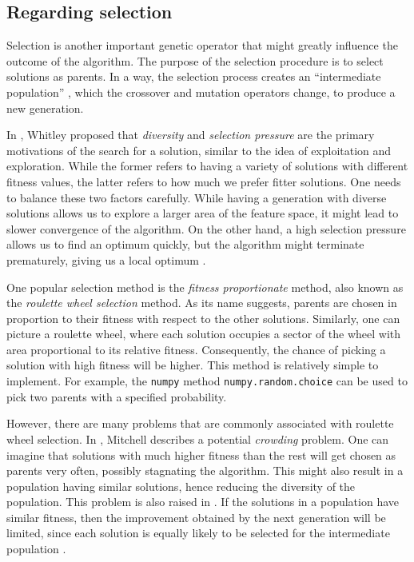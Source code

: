 \documentclass[12pt, twoside, a4paper]{report}
\begin{document}


\subsection{Regarding selection} \label{bg:ga:selection}
Selection is another important genetic operator that might greatly influence the outcome of the algorithm. The purpose of the selection procedure is to select solutions as parents. In a way, the selection process creates an ``intermediate population'' \cite{RefWorks:240}, which the crossover and mutation operators change, to produce a new generation.

In \cite{RefWorks:241}, Whitley proposed that \textit{diversity} and \textit{selection pressure} are the primary motivations of the search for a solution, similar to the idea of exploitation and exploration. While the former refers to having a variety of solutions with different fitness values, the latter refers to how much we prefer fitter solutions. One needs to balance these two factors carefully. While having a generation with diverse solutions allows us to explore a larger area of the feature space, it might lead to slower convergence of the algorithm. On the other hand, a high selection pressure allows us to find an optimum quickly, but the algorithm might terminate prematurely, giving us a local optimum \cite{RefWorks:242}.


One popular selection method is the \textit{fitness proportionate} method, also known as the \textit{roulette wheel selection} method. As its name suggests, parents are chosen in proportion to their fitness with respect to the other solutions. Similarly, one can picture a roulette wheel, where each solution occupies a sector of the wheel with area proportional to its relative fitness. Consequently, the chance of picking a solution with high fitness will be higher. This method is relatively simple to implement. For example, the \texttt{numpy} \cite{RefWorks:214} method \texttt{numpy.random.choice} can be used to pick two parents with a specified probability. 

However, there are many problems that are commonly associated with roulette wheel selection. In \cite{RefWorks:205}, Mitchell describes a potential \textit{crowding} problem. One can imagine that solutions with much higher fitness than the rest will get chosen as parents very often, possibly stagnating the algorithm. This might also result in a population having similar solutions, hence reducing the diversity of the population. This problem is also raised in \cite{RefWorks:239}. If the solutions in a population have similar fitness, then the improvement obtained by the next generation will be limited, since each solution is equally likely to be selected for the intermediate population \cite{RefWorks:245}.
\end{document}
